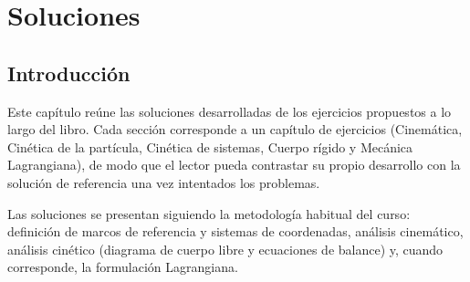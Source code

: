 
\chapter{Soluciones}

\section*{Introducción}

Este capítulo reúne las soluciones desarrolladas de los ejercicios propuestos a lo largo del
libro. Cada sección corresponde a un capítulo de ejercicios (Cinemática, Cinética de la
partícula, Cinética de sistemas, Cuerpo rígido y Mecánica Lagrangiana), de modo que el lector
pueda contrastar su propio desarrollo con la solución de referencia una vez intentados los
problemas.

Las soluciones se presentan siguiendo la metodología habitual del curso: definición de marcos
de referencia y sistemas de coordenadas, análisis cinemático, análisis cinético (diagrama de
cuerpo libre y ecuaciones de balance) y, cuando corresponde, la formulación Lagrangiana.
